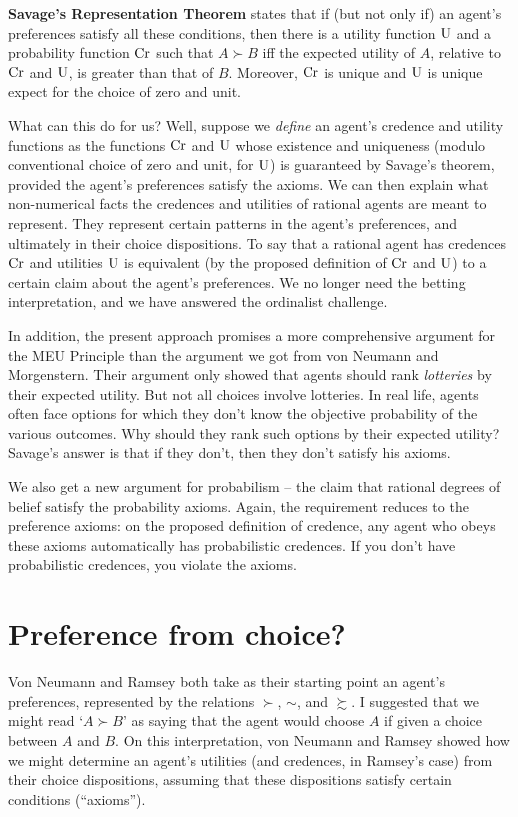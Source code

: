 \textbf{Savage's Representation Theorem} states that if (but not only if) an
agent's preferences satisfy all these conditions, then there is a utility
function $\text{U}$ and a probability function $\text{Cr}$ such that $A \succ B$ iff the
expected utility of $A$, relative to $\text{Cr}$ and $\text{U}$, is greater than that of $B$.
Moreover, $\text{Cr}$ is unique and $\text{U}$ is unique expect for the choice of zero and
unit.

What can this do for us? Well, suppose we \emph{define} an agent's credence and
utility functions as the functions $\text{Cr}$ and $\text{U}$ whose existence and uniqueness
(modulo conventional choice of zero and unit, for $\text{U}$) is guaranteed by
Savage's theorem, provided the agent's preferences satisfy the axioms. We can
then explain what non-numerical facts the credences and utilities of rational
agents are meant to represent. They represent certain patterns in the agent's
preferences, and ultimately in their choice dispositions. To say that a rational
agent has credences $\text{Cr}$ and utilities $\text{U}$ is equivalent (by the proposed
definition of $\text{Cr}$ and $\text{U}$) to a certain claim about the agent's preferences.
We no longer need the betting interpretation, and we have answered the
ordinalist challenge.

In addition, the present approach promises a more comprehensive argument for the
MEU Principle than the argument we got from von Neumann and Morgenstern. Their
argument only showed that agents should rank \emph{lotteries} by their expected
utility. But not all choices involve lotteries. In real life, agents often face
options for which they don't know the objective probability of the various
outcomes. Why should they rank such options by their expected utility?
Savage's answer is that if they don't, then they don't satisfy his axioms.

We also get a new argument for probabilism -- the claim that rational degrees of
belief satisfy the probability axioms. Again, the requirement reduces to the
preference axioms: on the proposed definition of credence, any agent who obeys
these axioms automatically has probabilistic credences. If you don't have
probabilistic credences, you violate the axioms.

\fi


\section{Preference from choice?}\label{sec:preferences-choices}

Von Neumann and Ramsey both take as their starting point an agent's preferences,
represented by the relations $\succ$, $\sim$, and $\succsim$. I suggested that
we might read `$A \succ B$' as saying that the agent would choose $A$ if given a
choice between $A$ and $B$. On this interpretation, von Neumann and Ramsey
showed how we might determine an agent's utilities (and credences, in Ramsey's
case) from their choice dispositions, assuming that these dispositions satisfy
certain conditions (``axioms'').

